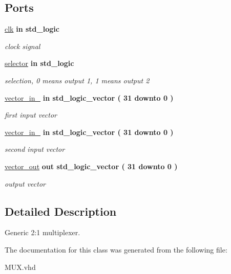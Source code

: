\subsection*{\-Ports}
 \begin{DoxyCompactItemize}
\item 
\hypertarget{class_m_u_x_a70f7f9ef1e412f6da35c2b9e17540895}{\hyperlink{class_m_u_x_a70f7f9ef1e412f6da35c2b9e17540895}{clk}  {\bfseries {\bfseries in }} {\bfseries std\-\_\-logic } }\label{class_m_u_x_a70f7f9ef1e412f6da35c2b9e17540895}

\begin{DoxyCompactList}\small\item\em clock signal \end{DoxyCompactList}\item 
\hypertarget{class_m_u_x_a9819d657d3d033c5c4ffe99e31b79bb2}{\hyperlink{class_m_u_x_a9819d657d3d033c5c4ffe99e31b79bb2}{selector}  {\bfseries {\bfseries in }} {\bfseries std\-\_\-logic } }\label{class_m_u_x_a9819d657d3d033c5c4ffe99e31b79bb2}

\begin{DoxyCompactList}\small\item\em selection, 0 means output 1, 1 means output 2 \end{DoxyCompactList}\item 
\hypertarget{class_m_u_x_adbc4a8307f6b8e70f215db699745f990}{\hyperlink{class_m_u_x_adbc4a8307f6b8e70f215db699745f990}{vector\-\_\-in\-\_}  {\bfseries {\bfseries in }} {\bfseries std\-\_\-logic\-\_\-vector (   31    downto    0  ) } }\label{class_m_u_x_adbc4a8307f6b8e70f215db699745f990}

\begin{DoxyCompactList}\small\item\em first input vector \end{DoxyCompactList}\item 
\hypertarget{class_m_u_x_aa66f7828cd4605fa3a26337c456221b1}{\hyperlink{class_m_u_x_aa66f7828cd4605fa3a26337c456221b1}{vector\-\_\-in\-\_}  {\bfseries {\bfseries in }} {\bfseries std\-\_\-logic\-\_\-vector (   31    downto    0  ) } }\label{class_m_u_x_aa66f7828cd4605fa3a26337c456221b1}

\begin{DoxyCompactList}\small\item\em second input vector \end{DoxyCompactList}\item 
\hypertarget{class_m_u_x_aba4981bcab558ff1bfef133843d39d43}{\hyperlink{class_m_u_x_aba4981bcab558ff1bfef133843d39d43}{vector\-\_\-out}  {\bfseries {\bfseries out }} {\bfseries std\-\_\-logic\-\_\-vector (   31    downto    0  ) } }\label{class_m_u_x_aba4981bcab558ff1bfef133843d39d43}

\begin{DoxyCompactList}\small\item\em output vector \end{DoxyCompactList}\end{DoxyCompactItemize}


\subsection{\-Detailed \-Description}
\-Generic 2\-:1 multiplexer. 

\-The documentation for this class was generated from the following file\-:\begin{DoxyCompactItemize}
\item 
\-M\-U\-X.\-vhd\end{DoxyCompactItemize}
